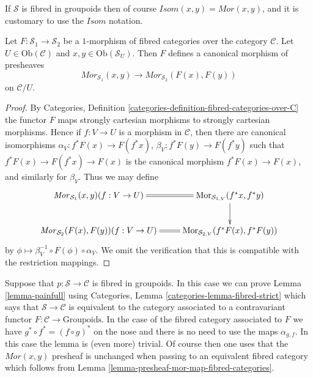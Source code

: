\noindent
If $\mathcal{S}$ is fibred in groupoids then of course
$\mathit{Isom}(x, y) = \mathit{Mor}(x, y)$, and it is
customary to use the $\mathit{Isom}$ notation.

\begin{lemma}
\label{lemma-presheaf-mor-map-fibred-categories}
Let $F : \mathcal{S}_1 \to \mathcal{S}_2$ be a $1$-morphism of fibred
categories over the category $\mathcal{C}$. Let $U \in \text{Ob}(\mathcal{C})$
and $x, y\in \text{Ob}(\mathcal{S}_U)$. Then $F$ defines a canonical
morphism of presheaves
$$
\mathit{Mor}_{\mathcal{S}_1}(x, y)
\longrightarrow
\mathit{Mor}_{\mathcal{S}_2}(F(x), F(y))
$$
on $\mathcal{C}/U$.
\end{lemma}

\begin{proof}
By
Categories, Definition \ref{categories-definition-fibred-categories-over-C}
the functor $F$ maps strongly cartesian morphisms to strongly cartesian
morphisms. Hence if $f : V \to U$ is a morphism in $\mathcal{C}$, then
there are canonical isomorphisms $\alpha_V : f^*F(x) \to F(f^*x)$,
$\beta_V : f^*F(y) \to F(f^*y)$ such that $f^*F(x) \to F(f^*x) \to F(x)$
is the canonical morphism $f^*F(x) \to F(x)$, and similarly for $\beta_V$.
Thus we may define
$$
\xymatrix{
\mathit{Mor}_{\mathcal{S}_1}(x, y)(f : V \to U) \ar@{=}[r] &
\text{Mor}_{\mathcal{S}_{1, V}}(f^\ast x, f^\ast y) \ar[d] \\
\mathit{Mor}_{\mathcal{S}_2}(F(x), F(y))(f : V \to U) \ar@{=}[r] &
\text{Mor}_{\mathcal{S}_{2, V}}(f^\ast F(x), f^\ast F(y))
}
$$
by $\phi \mapsto \beta_V^{-1} \circ F(\phi) \circ \alpha_V$.
We omit the verification that this is compatible with the restriction
mappings.
\end{proof}

\begin{remark}
\label{remark-alternative}
Suppose that $p : \mathcal{S} \to \mathcal{C}$ is fibred in groupoids.
In this case we can prove
Lemma \ref{lemma-painfull}
using
Categories, Lemma \ref{categories-lemma-fibred-strict}
which says that $\mathcal{S} \to \mathcal{C}$ is equivalent to the
category associated to a contravariant functor
$F : \mathcal{C} \to \text{Groupoids}$.
In the case of the fibred category associated to $F$
we have $g^* \circ f^* = (f \circ g)^*$ on the nose
and there is no need to use the maps $\alpha_{g, f}$.
In this case the lemma is (even more) trivial. Of course then
one uses that the $\mathit{Mor}(x, y)$ presheaf is
unchanged when passing to an equivalent fibred category which follows from
Lemma \ref{lemma-presheaf-mor-map-fibred-categories}.
\end{remark}

